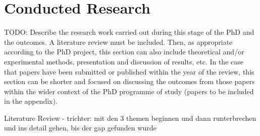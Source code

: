 \section{Conducted Research}
TODO: Describe the research work carried out during this stage of the PhD and the outcomes. A literature review must be included. Then, as appropriate according to the PhD project, this section can also include theoretical and/or experimental methods, presentation and discussion of results, etc. In the case that papers have been submitted or published within the year of the review, this section can be shorter and focused on discussing the outcomes from those papers within the wider context of the PhD programme of study (papers to be included in the appendix).

Literature Review
- trichter: mit den 3 themen beginnen und dann runterbrechen und ins detail gehen, bis der gap gefunden wurde

